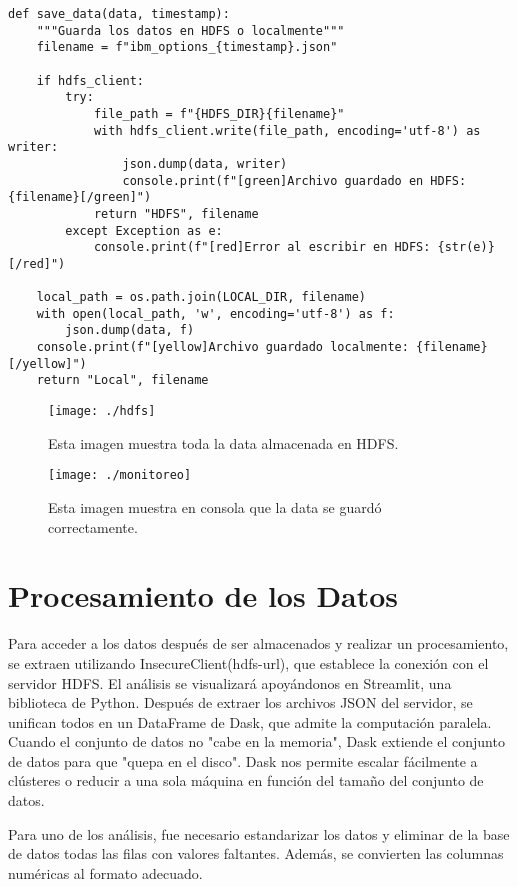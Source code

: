 \documentclass{article}
\begin{document}
	\begin{lstlisting}[style=python]
def save_data(data, timestamp):
	"""Guarda los datos en HDFS o localmente"""
	filename = f"ibm_options_{timestamp}.json"
			
	if hdfs_client:
	  	try:
			file_path = f"{HDFS_DIR}{filename}"
			with hdfs_client.write(file_path, encoding='utf-8') as writer:
				json.dump(data, writer)
				console.print(f"[green]Archivo guardado en HDFS: {filename}[/green]")
			return "HDFS", filename
		except Exception as e:
			console.print(f"[red]Error al escribir en HDFS: {str(e)}[/red]")
			
	local_path = os.path.join(LOCAL_DIR, filename)
	with open(local_path, 'w', encoding='utf-8') as f:
		json.dump(data, f)
	console.print(f"[yellow]Archivo guardado localmente: {filename}[/yellow]")
	return "Local", filename
		\end{lstlisting}
	\begin{figure}[h]
			\centering
			\texttt{[image: ./hdfs]}
			\caption{Esta imagen muestra toda la data almacenada en HDFS.}
			\label{fig:mi_imagen}
		
	\end{figure}
			\begin{figure}[h]
		\texttt{[image: ./monitoreo]}
		\caption{Esta imagen muestra en consola que la data se guardó correctamente.}
		\label{fig:mi_imagen}
	\end{figure}
	\vspace{1cm}
	\section{Procesamiento de los Datos}
Para acceder a los datos después de ser almacenados y realizar un procesamiento, se extraen utilizando InsecureClient(hdfs-url), que establece la conexión con el servidor HDFS. El análisis se visualizará apoyándonos en Streamlit, una biblioteca de Python. Después de extraer los archivos JSON del servidor, se unifican todos en un DataFrame de Dask, que admite la computación paralela. Cuando el conjunto de datos no "cabe en la memoria", Dask extiende el conjunto de datos para que "quepa en el disco". Dask nos permite escalar fácilmente a clústeres o reducir a una sola máquina en función del tamaño del conjunto de datos.

Para uno de los análisis, fue necesario estandarizar los datos y eliminar de la base de datos todas las filas con valores faltantes. Además, se convierten las columnas numéricas al formato adecuado.
\end{document}
